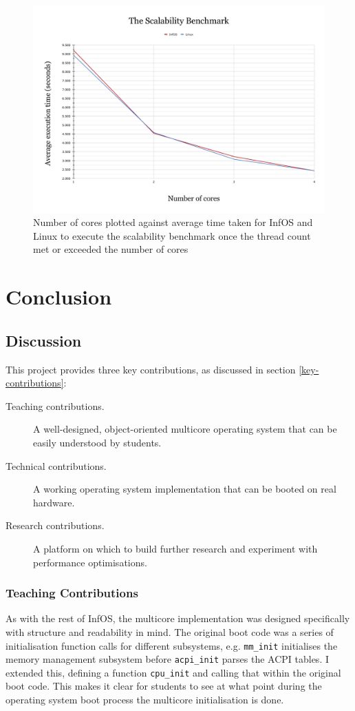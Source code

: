 \documentclass[bsc,frontabs,singlespacing,parskip,deptreport]{infthesis}
\begin{document}
\begin{figure}[h]
    \centering
    \includegraphics[scale=0.3]{figures/scalability-graph.pdf}
    \caption{Number of cores plotted against average time taken for InfOS and Linux to execute the scalability benchmark once the thread count met or exceeded the number of cores}
    \label{scalability-graph}
\end{figure}

\chapter{Conclusion}
\section{Discussion}
This project provides three key contributions, as discussed in section \ref{key-contributions}:
\begin{description}
    \item [Teaching contributions.] A well-designed, object-oriented multicore operating system that can be easily understood by students.
    \item [Technical contributions.] A working operating system implementation that can be booted on real hardware.
    \item [Research contributions. ] A platform on which to build further research and experiment with performance optimisations.
\end{description}

\subsection{Teaching Contributions}
As with the rest of InfOS, the multicore implementation was designed specifically with structure and readability in mind. The original boot code was a series of initialisation function calls for different subsystems, e.g. \verb|mm_init| initialises the memory management subsystem before \verb|acpi_init| parses the ACPI tables. I extended this, defining a function \verb|cpu_init| and calling that within the original boot code. This makes it clear for students to see at what point during the operating system boot process the multicore initialisation is done.
\end{document}

